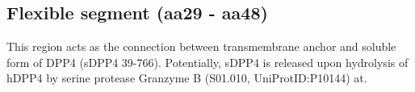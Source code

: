 \subsection{Flexible segment (aa29 - aa48)}

This region acts as the connection between transmembrane anchor and soluble form of DPP4 (sDPP4 39-766). Potentially, sDPP4 is released upon hydrolysis of hDPP4 by serine protease Granzyme B (S01.010, UniProtID:P10144) at.~\cite{Song_2018}
